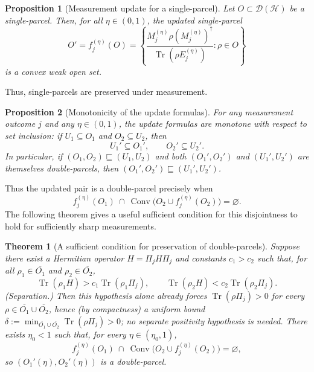 \documentclass[11pt, onecolumn]{article}
\newtheorem{theorem}{Theorem}
\newtheorem{proposition}{Proposition}
\begin{document}
\begin{proposition}[Measurement update for a single-parcel]
\label{prop:singleupdate}
Let \(O\subset\mathcal{D}(\mathcal{H})\) be a single-parcel. Then, for all \(\eta\in(0,1)\), the updated single-parcel
\[
O' = f_j^{(\eta)}(O) = \left\{\frac{M_j^{(\eta)}\rho (M_j^{(\eta)})^\dagger}{\operatorname{Tr}(\rho E_j^{(\eta)})}:\rho\in O\right\}
\]
is a convex weak open set.
\end{proposition}

Thus, single-parcels are preserved under measurement.

\begin{proposition}[Monotonicity of the update formulas]
\label{prop:monotone}
For any measurement outcome \(j\) and any $\eta\in(0,1)$, the update formulas are monotone with respect to set inclusion: if $U_1\subseteq O_1$ and $O_2\subseteq U_2$, then
\[
U_1'\subseteq O_1', \qquad O_2'\subseteq U_2'.
\]
In particular, if \((O_1,O_2)\sqsubseteq (U_1,U_2)\) and both $(O_1',O_2')$ and $(U_1',U_2')$ are themselves double-parcels, then \((O_1',O_2')\sqsubseteq(U_1',U_2')\).
\end{proposition}

Thus the updated pair is a double-parcel precisely when
\[
f_j^{(\eta)}(O_1)\ \cap\ \operatorname{Conv}\bigl(O_2\cup f_j^{(\eta)}(O_2)\bigr)=\varnothing.
\]
The following theorem gives a useful sufficient condition for this disjointness to hold for sufficiently sharp measurements.

\begin{theorem}[A sufficient condition for preservation of double-parcels]
\label{thm:double-preservation}
Suppose there exist a Hermitian operator \(H=\Pi_jH\Pi_j\) and constants \(c_1>c_2\) such that, for all \(\rho_1\in\overline{O_1}\) and \(\rho_2\in\overline{O_2}\),
\[
\operatorname{Tr}(\rho_1H) > c_1\operatorname{Tr}(\rho_1\Pi_j),\qquad
\operatorname{Tr}(\rho_2H) < c_2\operatorname{Tr}(\rho_2\Pi_j).
\]
\emph{(Separation.)} Then this hypothesis alone already forces $\operatorname{Tr}(\rho\Pi_j)>0$ for every $\rho\in\overline{O_1}\cup\overline{O_2}$, hence (by compactness) a uniform bound $\delta:=\min_{\overline{O_1}\cup\overline{O_2}}\operatorname{Tr}(\rho\Pi_j)>0$; no separate positivity hypothesis is needed. There exists $\eta_0<1$ such that, for every $\eta\in(\eta_0,1)$,
\[
f_j^{(\eta)}(O_1)\ \cap\ \operatorname{Conv}\bigl(O_2\cup f_j^{(\eta)}(O_2)\bigr)=\varnothing,
\]
so $(O_1'(\eta),O_2'(\eta))$ is a double-parcel.
\end{theorem}
\end{document}

